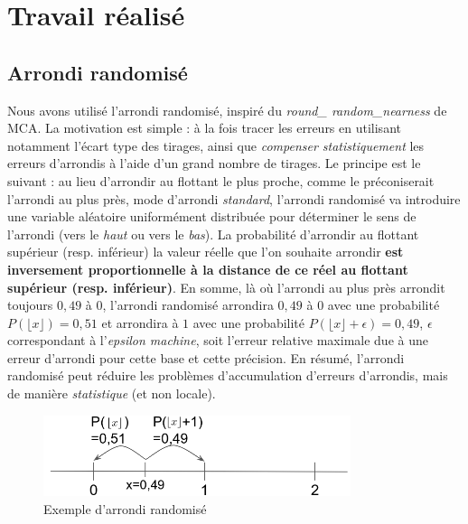 \documentclass[a4paper,11pt]{article}
\begin{document}



\section{Travail réalisé}

\subsection{Arrondi randomisé }
Nous avons utilisé l'arrondi randomisé, inspiré du \textit{round\_ random\_nearness} de MCA. 
La motivation est simple : à la fois tracer les erreurs en utilisant notamment l'écart type des tirages, ainsi que \textit{compenser statistiquement} les erreurs d'arrondis à l'aide d'un grand nombre de tirages.
Le principe est le suivant : au lieu d'arrondir au flottant le plus proche, comme le préconiserait l'arrondi au plus près, mode d'arrondi \textit{standard}, l'arrondi randomisé va introduire une variable aléatoire uniformément distribuée pour déterminer le sens de l'arrondi (vers le \textit{haut} ou vers le \textit{bas}).
La probabilité d'arrondir au flottant supérieur (resp. inférieur) la valeur réelle que l'on souhaite arrondir \textbf{est inversement proportionnelle à la distance de ce réel au flottant supérieur (resp. inférieur)}. En somme, là où l'arrondi au plus près arrondit toujours $0,49$ à $0$, l'arrondi randomisé arrondira $0,49$ à $0$ avec une probabilité $P(\lfloor x\rfloor )=0,51$ et arrondira à $1$ avec une probabilité $P(\lfloor x\rfloor + \epsilon)=0,49$, $\epsilon$ correspondant à l'\textit{epsilon machine}, soit l'erreur relative maximale due à une erreur d'arrondi pour cette base et cette précision. En résumé, l'arrondi randomisé peut réduire les problèmes d'accumulation d'erreurs d'arrondis, mais de manière \textit{statistique} (et non locale).
\begin{figure}[h]
  \begin{center}
    \includegraphics[width=9cm]{random_rounding}
    \caption{Exemple d'arrondi randomisé}
    \label{random_rounding}
  \end{center}
\end{figure}
\end{document}
